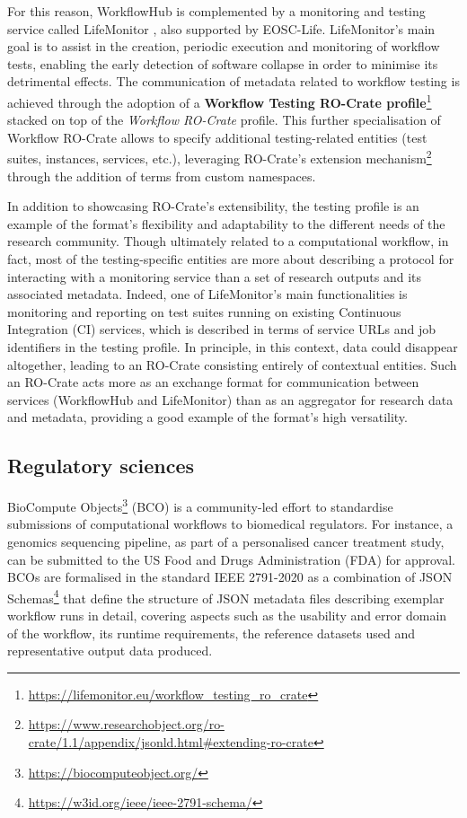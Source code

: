 \documentclass[ds,v1.1.2,openaccess]{iosart2x}%
\begin{document}
For this reason, WorkflowHub is complemented by a monitoring and
testing service called LifeMonitor \cite{about-lifemonitor}, also supported
by EOSC-Life. LifeMonitor's main goal is to assist in the creation,
periodic execution and monitoring of workflow tests, enabling the early
detection of software collapse in order to minimise its detrimental
effects. The communication of metadata related to workflow testing is
achieved through the adoption of a \textbf{Workflow Testing RO-Crate
profile}\footnote{\url{https://lifemonitor.eu/workflow_testing_ro_crate}} stacked on
top of the \textit{Workflow RO-Crate} profile. This further specialisation of
Workflow RO-Crate allows to specify additional testing-related entities
(test suites, instances, services, etc.), leveraging RO-Crate's
extension
mechanism\footnote{\url{https://www.researchobject.org/ro-crate/1.1/appendix/jsonld.html\#extending-ro-crate}}
through the addition of terms from custom namespaces.

In addition to showcasing RO-Crate's extensibility, the testing profile
is an example of the format's flexibility and adaptability to the
different needs of the research community. Though ultimately related to
a computational workflow, in fact, most of the testing-specific
entities are more about describing a protocol for interacting with a
monitoring service than a set of research outputs and its associated
metadata. Indeed, one of LifeMonitor's main functionalities is
monitoring and reporting on test suites running on existing Continuous
Integration (CI) services, which is described in terms of service URLs
and job identifiers in the testing profile. In principle, in this
context, data could disappear altogether, leading to an RO-Crate
consisting entirely of contextual entities. Such an RO-Crate acts more
as an exchange format for communication between services (WorkflowHub
and LifeMonitor) than as an aggregator for research data and metadata,
providing a good example of the format's high versatility.


\subsection{Regulatory sciences}%

\label{sec:regulatorysciences}

BioCompute Objects\footnote{\url{https://biocomputeobject.org/}} (BCO)
\cite{doi:10.1371/journal.pbio.3000099} is a community-led effort to
standardise submissions of computational workflows to biomedical
regulators. For instance, a genomics sequencing pipeline, as part of a
personalised cancer treatment study, can be submitted to the US Food
and Drugs Administration (FDA) for approval. BCOs are formalised in the
standard IEEE 2791-2020 \cite{doi:10.1109/IEEESTD.2020.9094416} as a
combination of JSON
Schemas\footnote{\url{https://w3id.org/ieee/ieee-2791-schema/}}
that define the structure of JSON metadata files describing exemplar
workflow runs in detail, covering aspects such as the usability and
error domain of the workflow, its runtime requirements, the reference
datasets used and representative output data produced.
\end{document}
